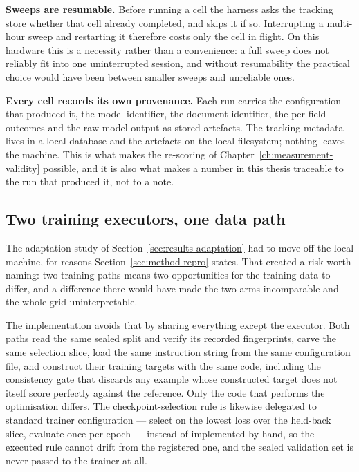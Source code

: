 \textbf{Sweeps are resumable.} Before running a cell the harness asks the tracking store
whether that cell already completed, and skips it if so. Interrupting a multi-hour sweep and
restarting it therefore costs only the cell in flight. On this hardware this is a necessity
rather than a convenience: a full sweep does not reliably fit into one uninterrupted session, and without
resumability the practical choice would have been between smaller sweeps and unreliable ones.

\textbf{Every cell records its own provenance.} Each run carries the configuration that
produced it, the model identifier, the document identifier, the per-field outcomes and the raw
model output as stored artefacts. The tracking metadata lives in a local database and the
artefacts on the local filesystem; nothing leaves the machine. This is what makes the
re-scoring of Chapter~\ref{ch:measurement-validity} possible, and it is also what makes a
number in this thesis traceable to the run that produced it, not to a note.

\subsection{Two training executors, one data path}

The adaptation study of Section~\ref{sec:results-adaptation} had to move off the local machine, for
reasons Section~\ref{sec:method-repro} states. That created a risk worth naming: two training paths
means two opportunities for the training data to differ, and a difference there would have
made the two arms incomparable and the whole grid uninterpretable.

The implementation avoids that by sharing everything except the executor. Both paths read the
same sealed split and verify its recorded fingerprints, carve the same selection slice, load
the same instruction string from the same configuration file, and construct their training
targets with the same code, including the consistency gate that discards any example whose
constructed target does not itself score perfectly against the reference. Only the code that
performs the optimisation differs. The checkpoint-selection rule is likewise delegated to
standard trainer configuration --- select on the lowest loss over the held-back slice, evaluate
once per epoch --- instead of implemented by hand, so the executed rule cannot drift from the
registered one, and the sealed validation set is never passed to the trainer at all.

